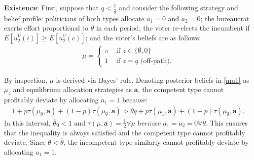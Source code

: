 \documentclass[11pt,english]{article}
\begin{document}
\textbf{Existence}: First, suppose that $q < \frac{1}{\overline{\theta}}$ and consider the following strategy and belief profile: politicians of both types allocate $a_1 = 0$ and $a_2 = 0$; the bureaucrat exerts effort proportional to $\theta$ in each period; the voter re-elects the incumbent if $E[u_2^V(i)] \geq E[u_2^V(c)]$; and the voter's beliefs are as follows: 
\begin{align}\label{mu1}
\mu = \begin{cases}
\pi & \text{ if } z \in \{\emptyset, 0\}\\
1 & \text{ if } z = q \text{ (off-path)}.
\end{cases}
\end{align}


By inspection, $\mu$ is derived via Bayes' rule. Denoting posterior beliefs in \eqref{mu1} as $\mu_z$ and equilibrium allocation strategies as $\boldsymbol{a}$, the competent type cannot profitably deviate by allocating $a_1 = 1$ because:
\begin{align*}
1 + p\tau(\mu_0, \boldsymbol{a}) +(1-p)\tau(\mu_\emptyset, \boldsymbol{a}) > \overline{\theta}q + p\tau(\mu_1, \boldsymbol{a}) + (1-p)\tau(\mu_\emptyset, \boldsymbol{a}).
\end{align*}
In this interval, $\overline{\theta}q < 1$ and $\tau(\mu, \boldsymbol{a}) = \frac{1}{2} \forall \mu$ because $a_1= a_2 = 0 \forall \theta$. This ensures that the inequality is always satisfied and the competent type cannot profitably deviate. Since $\underline{\theta}< \overline{\theta}$, the incompetent type similarly cannot profitably deviate by allocating $a_1=1$.\\
\end{document}

